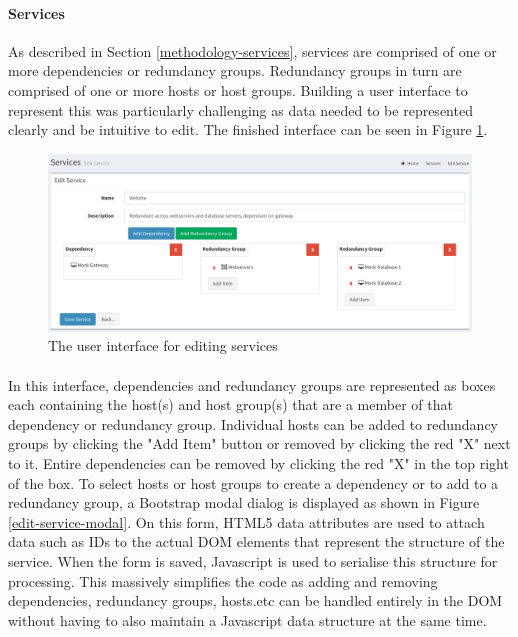 \documentclass[bsc,logo,twoside,singlespacing]{infthesis}
\begin{document}
\paragraph*{Services}
	As described in Section \ref{methodology-services}, services are comprised of
	one or more dependencies or redundancy groups.  Redundancy groups in turn are
	comprised of one or more hosts or host groups.  Building a user interface to
	represent this was particularly challenging as data needed to be represented
	clearly and be intuitive to edit.  The finished interface can be seen in
	Figure \ref{edit-service}.
	
\begin{figure}[H]
	\centering
	\caption{The user interface for editing services}
	\label{edit-service}
	\includegraphics[scale=0.44]{assets/screenshots/edit-service.pdf}
\end{figure}

\paragraph*{}
	In this interface, dependencies and redundancy groups are represented as boxes
	each containing the host(s) and host group(s) that are a member of that
	dependency or redundancy group.  Individual hosts can be added to redundancy
	groups by clicking the "Add Item" button or removed by clicking the red "X"
	next to it.  Entire dependencies can be removed by clicking the red "X" in the
	top right of the box.  To select hosts or host groups to create a dependency
	or to add to a redundancy group, a Bootstrap modal dialog is displayed as
	shown in Figure \ref{edit-service-modal}.  On this form, HTML5 data attributes
	are used to attach data such as IDs to the actual DOM elements that represent
	the structure of the service.  When the form is saved, Javascript is used to
	serialise this structure for processing.  This massively simplifies the code
	as adding and removing dependencies, redundancy groups, hosts.etc can be
	handled entirely in the DOM without having to also maintain a Javascript data
	structure at the same time.
	
\end{document}

